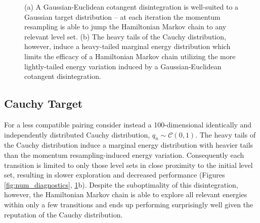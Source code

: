 \documentclass[stslayout]{imsart}
\begin{document}
\begin{figure}
\centering
{}
\caption{(a) A Gaussian-Euclidean cotangent disintegration is well-suited
to a Gaussian target distribution -- at each iteration the momentum
resampling is able to jump the Hamiltonian Markov chain to any relevant
level set. (b) The heavy tails of the Cauchy distribution, however, induce a 
heavy-tailed marginal energy distribution which limits the efficacy of a 
Hamiltonian Markov chain utilizing the more lightly-tailed energy variation 
induced by a Gaussian-Euclidean cotangent disintegration.}
\label{fig:gauss_cauchy_exp}
\end{figure}

\subsection{Cauchy Target}

For a less compatible pairing consider instead a 100-dimensional identically 
and independently distributed Cauchy distribution, 
$q_{n} \sim \mathcal{C} \! \left( 0, 1 \right)$.  The heavy tails of the Cauchy
distribution induce a marginal energy distribution with heavier tails than
the momentum resampling-induced energy variation.  Consequently each 
transition is limited to only those level sets in close proximity to the initial 
level set, resulting in slower exploration and decreased performance 
(Figures \ref{fig:num_diagnostics}, \ref{fig:gauss_cauchy_exp}b).  Despite the 
suboptimality of this disintegration, however, the Hamiltonian Markov chain 
is able to explore all relevant energies within only a few transitions and 
ends up performing surprisingly well given the reputation of the Cauchy 
distribution.
\end{document}
